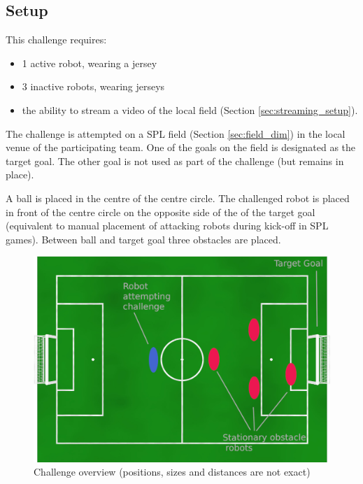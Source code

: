 \subsection{Setup}

This challenge requires:
\begin{itemize}
	\item 1 active robot, wearing a jersey
	\item 3 inactive robots, wearing jerseys
	\item the ability to stream a video of the local field (\cf Section \ref{sec:streaming_setup}).
\end{itemize}

The challenge is attempted on a SPL field (\cf Section \ref{sec:field_dim}) in the local venue of the participating team. One of the goals on the field is designated as the target goal. The other goal is not used as part of the challenge (but remains in place).

A ball is placed in the centre of the centre circle. The challenged robot is placed in front of the centre circle on the opposite side of the of the target goal (equivalent to manual placement of attacking robots during kick-off in SPL games). Between ball and target goal three obstacles are placed.

\begin{figure}[ht]
	\centering
	\includegraphics[width=1.0\textwidth]{figs/obstacle_challenge_2021.jpeg}
	\caption{Challenge overview (positions, sizes and distances are not exact)}
\end{figure}

